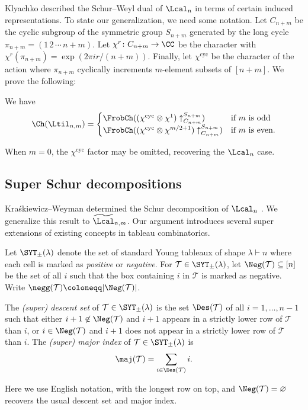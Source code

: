 Klyachko \cite{Kly} described the Schur--Weyl dual of $\Lcal_n$ in terms of certain induced representations. To state our generalization, we need some notation. Let $C_{n+m}$ be the cyclic subgroup of the symmetric group $S_{n+m}$ generated by the long cycle $\pi_{n+m} = (1\,2\,\cdots\,n+m)$. Let $\chi^r \colon C_{n+m} \to \CC$ be the character with $\chi^r(\pi_{n+m}) = \exp(2\pi ir/(n+m))$. Finally, let $\chi^\mathrm{cyc}$ be the character of the action where $\pi_{n+m}$ cyclically increments $m$-element subsets of $[n+m]$. We prove the following: 
\begin{thm}\label{thm:super-induced}
We have
\begin{equation}
    \Ch(\Ltil_{n,m}) =
    \begin{cases}
        \FrobCh((\chi^\mathrm{cyc} \otimes \chi^1)\uparrow_{C_{n+m}}^{S_{n+m}}) & \text{if $m$ is odd} \\
        \FrobCh((\chi^\mathrm{cyc} \otimes \chi^{m/2+1})\uparrow_{C_{n+m}}^{S_{n+m}}) & \text{if $m$ is even.}
    \end{cases}
\end{equation}
\end{thm}
When $m=0$, the $\chi^\mathrm{cyc}$ factor may be omitted, recovering the $\Lcal_n$ case.

\subsection{Super Schur decompositions}

Kra{\'s}kiewicz--Weyman determined the Schur decomposition of $\Lcal_n$ \cite{KW}. We generalize this result to $\widetilde{\Lcal}_{n,m}$. Our argument introduces several super extensions of existing concepts in tableau combinatorics.

Let $\SYT_\pm(\lambda)$ denote the set of standard Young tableaux of shape $\lambda \vdash n$ where each cell is marked as \textit{positive} or \textit{negative}. For $\mathcal{T} \in \SYT_\pm(\lambda)$, let $\Neg(\mathcal{T}) \subseteq [n]$ be the set of all $i$ such that the box containing $i$ in $\mathcal{T}$ is marked as negative. Write $\negg(\mathcal{T}) \coloneqq |\Neg(\mathcal{T})|$.
\begin{defi}
    The \textit{(super) descent set} of $\mathcal{T} \in \SYT_\pm(\lambda)$ is the set $\Des(\mathcal{T})$ of all $i=1, \ldots, n-1$ such that either $i+1 \not\in \Neg(\mathcal{T})$ and $i+1$ appears in a strictly lower row of $\mathcal{T}$ than $i$, or $i \in \Neg(\mathcal{T})$ and $i+1$ does not appear in a strictly lower row of $\mathcal{T}$ than $i$. The \textit{(super) major index} of $\mathcal{T} \in \SYT_\pm(\lambda)$ is
\begin{equation}\label{eq:super-maj}
    \maj(\mathcal{T}) = \sum_{i \in \Des(\mathcal{T})} i.
\end{equation}
\end{defi}
Here we use English notation, with the longest row on top, and $\Neg(\mathcal{T}) = \varnothing$ recovers the usual descent set and major index. 

